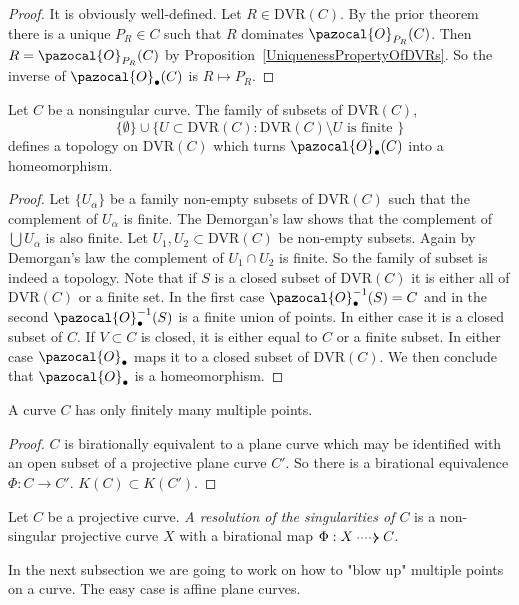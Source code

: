         \begin{proof}
            It is obviously well-defined. Let $R\in \mathrm{DVR}(C)$. By the prior theorem there is a unique $P_R\in C$ such that $R$ dominates $\pazocal{O}_{P_R}(C)$. Then $R=\pazocal{O}_{P_R}(C)$ by Proposition~\ref{UniquenessPropertyOfDVRs}. So the inverse of $\pazocal{O}_\bullet(C)$ is $R\mapsto P_R$.  
        \end{proof}
        \begin{proposition}
            Let $C$ be a nonsingular curve. The family of subsets of $\mathrm{DVR}(C)$,
            $$\{\emptyset\}\cup \{U\subset \mathrm{DVR}(C) : \mathrm{DVR}(C)\setminus U \text{ is finite }\}$$
            defines a topology on $\mathrm{DVR}(C)$ which turns $\pazocal{O}_\bullet(C)$ into a homeomorphism.
        \end{proposition}
        \begin{proof}
            Let $\{U_\alpha\}$ be a family non-empty subsets of $\mathrm{DVR}(C)$ such that the complement of $U_\alpha$ is finite. The Demorgan's law shows that the complement of $\bigcup U_\alpha$ is also finite. Let $U_1,U_2\subset \mathrm{DVR}(C)$ be non-empty subsets. Again by Demorgan's law the complement of $U_1\cap U_2$ is finite. So the family of subset is indeed a topology. Note that if $S$ is a closed subset of $\mathrm{DVR}(C)$ it is either all of $\mathrm{DVR}(C)$ or a finite set. In the first case $\pazocal{O}_\bullet^{-1}(S)=C$ and in the second $\pazocal{O}_\bullet^{-1}(S)$ is a finite union of points. In either case it is a closed subset of $C$. If $V\subset C$ is closed, it is either equal to $C$ or a finite subset. In either case $\pazocal{O}_\bullet$ maps it to a closed subset of $\mathrm{DVR}(C)$. We then conclude that $\pazocal{O}_\bullet$ is a homeomorphism. 
        \end{proof}
        \begin{proposition}
            A curve $C$ has only finitely many multiple points.
        \end{proposition}
        \begin{proof}
            $C$ is birationally equivalent to a plane curve which may be identified with an open subset of a projective plane curve $C'$. So there is a birational equivalence $\Phi : C \rightarrow C'$. $K(C)\subset K(C')$.
        \end{proof}
        \begin{definition}
            Let $C$ be a projective curve. \textit{A resolution of the singularities of $C$} is a non-singular projective curve $X$ with a birational map $\Phi : X\dottedarrow C$. 
        \end{definition}
        In the next subsection we are going to work on how to "blow up" multiple points on a curve. The easy case is affine plane curves. 
